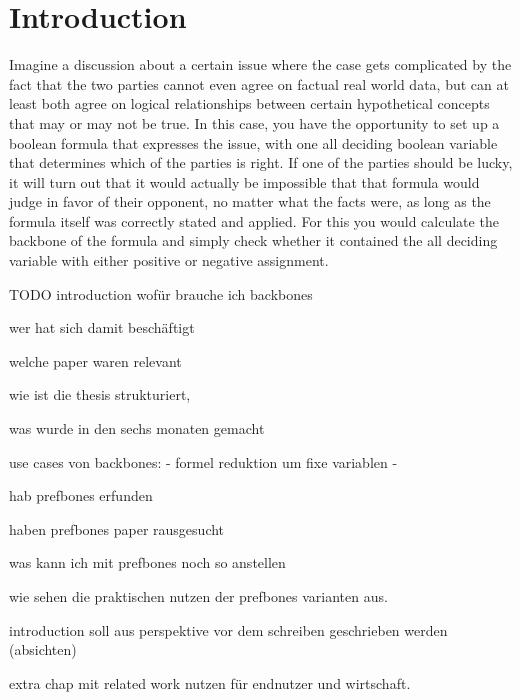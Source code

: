 \chapter{Introduction}
Imagine a discussion about a certain issue where the case gets complicated by the fact that the two parties cannot even agree on factual real world data, but can at least both agree on logical relationships between certain hypothetical concepts that may or may not be true. In this case, you have the opportunity to set up a boolean formula that expresses the issue, with one all deciding boolean variable that determines which of the parties is right. If one of the parties should be lucky, it will turn out that it would actually be impossible that that formula would judge in favor of their opponent, no matter what the facts were, as long as the formula itself was correctly stated and applied. For this you would calculate the backbone of the formula and simply check whether it contained the all deciding variable with either positive or negative assignment. 


TODO introduction
wofür brauche ich backbones

wer hat sich damit beschäftigt

welche paper waren relevant

wie ist die thesis strukturiert, 

was wurde in den sechs monaten gemacht


use cases von backbones:
- formel reduktion um fixe variablen
- 



hab prefbones erfunden

haben prefbones paper rausgesucht

was kann ich mit prefbones noch so anstellen

wie sehen die praktischen nutzen der prefbones varianten aus.



introduction soll aus perspektive vor dem schreiben geschrieben werden (absichten)

extra chap mit related work
nutzen für endnutzer und wirtschaft.